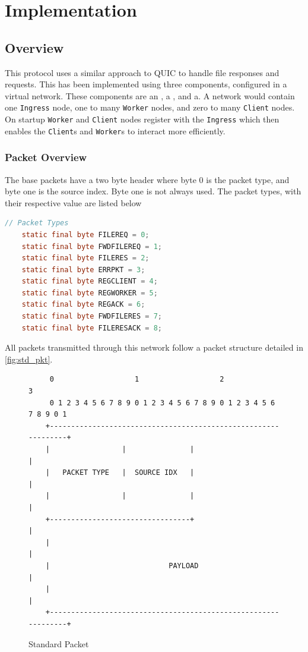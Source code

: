 \documentclass{article}
\newcommand{\code}[1]{\texttt{#1}}
\begin{document}
\section{Implementation}
\subsection{Overview}
This protocol uses a similar approach to QUIC to handle file responses and requests. This has been implemented using three components, configured in a virtual network. These components are an \code{}, a \code{}, and a\code{}. A network would contain one \code{Ingress} node, one to many \code{Worker} nodes, and zero to many \code{Client} nodes. On startup \code{Worker} and \code{Client} nodes register with the \code{Ingress} which then enables the \code{Client}s and \code{Worker}s to interact more efficiently. 
\subsubsection[Packet]{Packet Overview}

The base packets have a two byte header where byte 0 is the packet type, and byte one is the source index. Byte one is not always used. The packet types, with their respective value are listed below
\begin{lstlisting}[language=java,caption={[Encoded Packet Types]Code snippet from \code{Node} with the encoded packet types},label={lst:packet_types}]
    // Packet Types
    static final byte FILEREQ = 0;
    static final byte FWDFILEREQ = 1;
    static final byte FILERES = 2;
    static final byte ERRPKT = 3;
    static final byte REGCLIENT = 4;
    static final byte REGWORKER = 5;
    static final byte REGACK = 6;
    static final byte FWDFILERES = 7;
    static final byte FILERESACK = 8;
\end{lstlisting}

All packets transmitted through this network follow a packet structure detailed in \autoref{fig:std_pkt}.
\begin{figure}[!ht]
	\centering
	\begin{BVerbatim}
	 0                   1                   2                   3  
	 0 1 2 3 4 5 6 7 8 9 0 1 2 3 4 5 6 7 8 9 0 1 2 3 4 5 6 7 8 9 0 1
	+---------------------------------------------------------------+
	|                 |               |                             |
	|   PACKET TYPE   |  SOURCE IDX   |                             |
	|                 |               |                             |
	+---------------------------------+                             |
	|                                                               |
	|                            PAYLOAD                            |
	|                                                               |
	+---------------------------------------------------------------+
	\end{BVerbatim}
	\caption{Standard Packet}
	\label{fig:std_pkt}
\end{figure}
\end{document}
